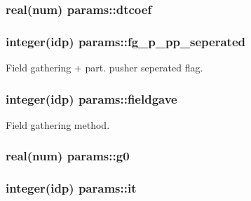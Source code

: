\subsubsection[{\texorpdfstring{dtcoef}{dtcoef}}]{\setlength{\rightskip}{0pt plus 5cm}real(num) params\+::dtcoef}\hypertarget{namespaceparams_a565cff6b9c99bcab68c1ae3af5f03d9e}{}\label{namespaceparams_a565cff6b9c99bcab68c1ae3af5f03d9e}
\subsubsection[{\texorpdfstring{fg\+\_\+p\+\_\+pp\+\_\+seperated}{fg_p_pp_seperated}}]{\setlength{\rightskip}{0pt plus 5cm}integer(idp) params\+::fg\+\_\+p\+\_\+pp\+\_\+seperated}\hypertarget{namespaceparams_a58efb719fdc3fbbfa8c6beb237ce2716}{}\label{namespaceparams_a58efb719fdc3fbbfa8c6beb237ce2716}


Field gathering + part. pusher seperated flag. 

\subsubsection[{\texorpdfstring{fieldgave}{fieldgave}}]{\setlength{\rightskip}{0pt plus 5cm}integer(idp) params\+::fieldgave}\hypertarget{namespaceparams_afd98a17f8dde6a4f7d4e7b0efb7384ea}{}\label{namespaceparams_afd98a17f8dde6a4f7d4e7b0efb7384ea}


Field gathering method. 

\subsubsection[{\texorpdfstring{g0}{g0}}]{\setlength{\rightskip}{0pt plus 5cm}real(num) params\+::g0}\hypertarget{namespaceparams_af27554c70c98a90a2d5fbd7a4083f366}{}\label{namespaceparams_af27554c70c98a90a2d5fbd7a4083f366}
\subsubsection[{\texorpdfstring{it}{it}}]{\setlength{\rightskip}{0pt plus 5cm}integer(idp) params\+::it}\hypertarget{namespaceparams_aa53b49f79463d25c9fe7a51e6b990067}{}\label{namespaceparams_aa53b49f79463d25c9fe7a51e6b990067}


